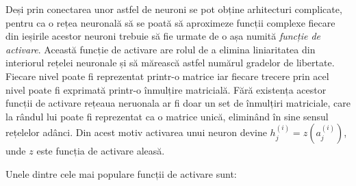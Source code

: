 \documentclass[a4paper,12pt]{book}
\begin{document}
			Deși prin conectarea unor astfel de neuroni se pot obține arhitecturi complicate, pentru ca o rețea neuronală să se poată să aproximeze funcții complexe fiecare din ieșirile acestor neuroni trebuie să fie urmate de o așa numită \textit{funcție de activare}. Această funcție de activare are rolul de a elimina liniaritatea din interiorul rețelei neuronale și să mărească astfel numărul gradelor de libertate. Fiecare nivel poate fi reprezentat printr-o matrice iar fiecare trecere prin acel nivel poate fi exprimată printr-o înmulțire matricială. Fără existența acestor funcții de activare rețeaua neruonala ar fi doar un set de înmulțiri matriciale, care la rândul lui poate fi reprezentat ca o matrice unică, eliminând în sine sensul rețelelor adânci. Din acest motiv activarea unui neuron devine $h_j^{(i)} = z(a_j^{(i)})$, unde $z$ este funcția de activare aleasă. \par
			\noindent Unele dintre cele mai populare funcții de activare sunt:
\end{document}
